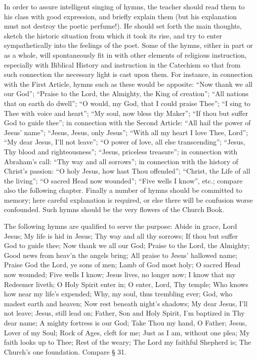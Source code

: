 In order to assure intelligent singing of hymns, the teacher should read them to his class with good expression, and briefly explain them (but his explanation must not destroy the poetic perfume!). He should set forth the main thoughts, sketch the historic situation from which it took its rise, and try to enter sympathetically into the feelings of the poet. Some of the hymns, either in part or as a whole, will spontaneously fit in with other elements of religious
instruction, especially with Biblical History and instruction in the Catechism so that from such connection the necessary light is cast upon them. For instance, in connection with the First Article, hymns such as these would be apposite: “Now thank we all our God”; “Praise to the Lord, the Almighty, the King of creation”; “All nations that on earth do dwell”; “O would, my God, that I could praise Thee”; “I sing to Thee with voice and heart”; “My soul, now bless thy Maker”; “If thou but suffer God to guide thee”; in connection with the Second Article: “All hail the power of Jesus’ name”; “Jesus, Jesus, only Jesus”; “With all my heart I love Thee, Lord”; “My dear Jesus, I’ll not leave”; “O power of love, all else transcending”; “Jesus, Thy blood and righteousness”; “Jesus, priceless treasure”; in connection with Abraham’s call: “Thy way and all sorrows”; in connection with the history of Christ’s passion: “O holy Jesus, how hast Thou offended”; “Christ, the Life of all the living”; “O sacred Head now wounded”; “Five wells I know”, etc.; compare also the following chapter. Finally a number of hymns should be committed to memory; here careful explanation is required, or else there will be confusion worse confounded. Such hymns should be the very flowers of the Church Book.

The following hymns are qualified to serve the purpose: Abide in grace, Lord Jesus; My life is hid in Jesus; Thy way and all thy sorrows; If thou but suffer God to guide thee; Now thank we all our God; Praise to the Lord, the Almighty; Good news from heav’n the angels bring; All praise to Jesus’ hallowed name; Praise God the Lord, ye sons of men; Lamb of God most holy; O sacred Head now wounded; Five wells I know; Jesus lives, no longer now; I know that my Redeemer liveth; O Holy Spirit enter in; O enter, Lord, Thy temple; Who knows how near my life’s expended; Why, my soul, thus trembling ever; God, who madest earth and heaven; Now rest beneath night’s shadows; My dear Jesus, I’ll not leave; Jesus, still lead on; Father, Son and Holy Spirit, I’m baptized in Thy dear name; A mighty fortress is our God; Take Thou my hand,
O Father; Jesus, Lover of my Soul; Rock of Ages, cleft for me; Just as I am, without one plea; My faith looks up to Thee; Rest of the weary; The Lord my faithful Shepherd is; The Church’s one foundation. Compare § 31.

